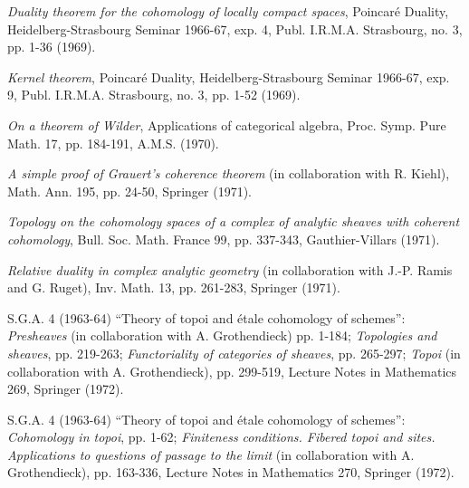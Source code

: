\begin{description}
\item[{[12]}] \emph{Duality theorem for the cohomology of locally compact
spaces}, Poincaré Duality, Heidelberg-Strasbourg Seminar 1966-67, exp. 4,
Publ. I.R.M.A. Strasbourg, no. 3, pp. 1-36 (1969).

\item[{[13]}] \emph{Kernel theorem}, Poincaré Duality,
Heidelberg-Strasbourg Seminar 1966-67, exp. 9, Publ. I.R.M.A. Strasbourg,
no. 3, pp. 1-52 (1969).

\item[{[14]}] \emph{On a theorem of Wilder}, Applications of categorical
algebra, Proc. Symp. Pure Math. 17, pp. 184-191, A.M.S. (1970).

\item[{[15]}] \emph{A simple proof of Grauert's coherence theorem}
(in collaboration with R. Kiehl), Math. Ann. 195, pp. 24-50,
Springer (1971).

\item[{[16]}] \emph{Topology on the cohomology spaces of a complex of
analytic sheaves with coherent cohomology}, Bull. Soc. Math. France 99,
pp. 337-343, Gauthier-Villars (1971).

\item[{[17]}] \emph{Relative duality in complex analytic geometry}
(in collaboration with J.-P. Ramis and G. Ruget), Inv. Math. 13,
pp. 261-283, Springer (1971).

\item[{[18]}] S.G.A. 4 (1963-64) ``Theory of topoi and étale cohomology of
schemes'': \emph{Presheaves} (in collaboration with A. Grothendieck)
pp. 1-184; \emph{Topologies and sheaves}, pp. 219-263;
\emph{Functoriality of categories of sheaves}, pp. 265-297;
\emph{Topoi} (in collaboration with A. Grothendieck), pp. 299-519,
Lecture Notes in Mathematics 269, Springer (1972).

\item[{[19]}] S.G.A. 4 (1963-64) ``Theory of topoi and étale cohomology of
schemes'': \emph{Cohomology in topoi}, pp. 1-62;
\emph{Finiteness conditions. Fibered topoi and sites. Applications to questions
of passage to the limit} (in collaboration with A. Grothendieck), pp. 163-336,
Lecture Notes in Mathematics 270, Springer (1972).


\end{description}
